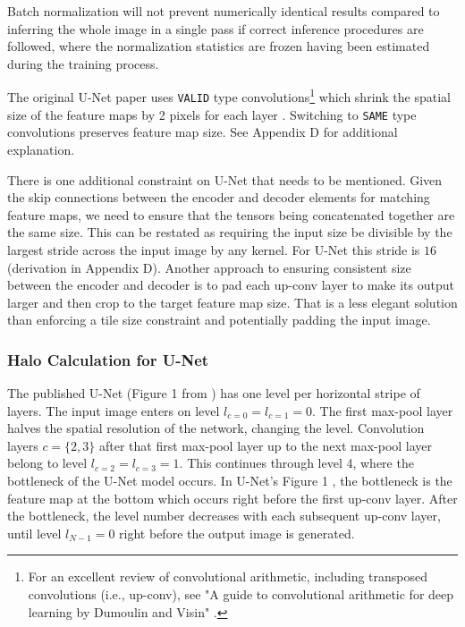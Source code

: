 \documentclass[10pt, indentfirst]{article}
\begin{document}
Batch normalization will not prevent numerically identical results compared to inferring the whole image in a single pass if correct inference procedures are followed, where the normalization statistics are frozen having been estimated during the training process.

The original U-Net paper uses \texttt{VALID} type convolutions\footnote{For an excellent review of convolutional arithmetic, including transposed convolutions (i.e., up-conv), see "A guide to convolutional arithmetic for deep learning by Dumoulin and Visin" \citep{Dumoulin2018}.} which shrink the spatial size of the feature maps by 2 pixels for each layer \citep{Dumoulin2018}. Switching to \texttt{SAME} type convolutions preserves feature map size. See Appendix D for additional explanation. 

There is one additional constraint on U-Net that needs to be mentioned. Given the skip connections between the encoder and decoder elements for matching feature maps, we need to ensure that the tensors being concatenated together are the same size. This can be restated as requiring the input size be divisible by the largest stride across the input image by any kernel. For U-Net this stride is $16$ (derivation in Appendix D). Another approach to ensuring consistent size between the encoder and decoder is to pad each up-conv layer to make its output larger and then crop to the target feature map size. That is a less elegant solution than enforcing a tile size constraint and potentially padding the input image.


\subsubsection{Halo Calculation for U-Net}

The published U-Net (Figure 1 from \citep{Ronneberger2015a}) has one level per horizontal stripe of layers. The input image enters on level $l_{c=0} = l_{c=1} = 0$. The first max-pool layer halves the spatial resolution of the network, changing the level. Convolution layers $c = \{2, 3\}$ after that first max-pool layer up to the next max-pool layer belong to level $l_{c=2}=l_{c=3} = 1$. This continues through level 4, where the bottleneck of the U-Net model occurs. In U-Net's Figure 1 \citep{Ronneberger2015a}, the bottleneck is the feature map at the bottom which occurs right before the first up-conv layer. After the bottleneck, the level number decreases with each subsequent up-conv layer, until level $l_{N-1} = 0$ right before the output image is generated. 
\end{document}
